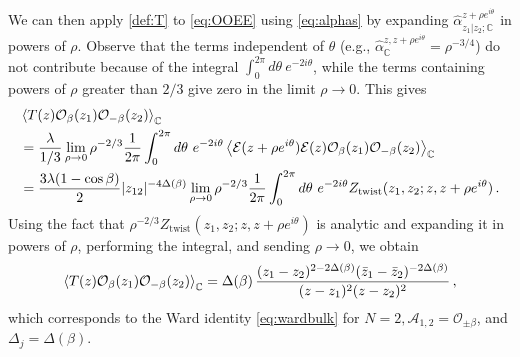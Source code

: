 \documentclass[a4paper,11pt]{article}
\begin{document}
We can then apply \eqref{def:T} to \eqref{eq:OOEE} using \eqref{eq:alphas} by expanding $\hat{\alpha}^{z+\rho e^{i \theta}}_{z_1|z_2;\mathbb{C}}$ in powers of $\rho$. Observe that the terms independent of $\theta$ (e.g., $\hat\alpha_{\mathbb{C}}^{z,z+\rho e^{i \theta}}=\rho^{-3/4}$) do not contribute because of the integral $\int_0^{2\pi} d \theta ~ e^{-2i \theta}$, while the terms containing powers of $\rho$ greater than $2/3$ give zero in the limit $\rho \to 0$.
This gives
\begin{align}
\begin{split} \label{eq:TOO-Ztwist}
    & \Braket{T(z) \mathcal{O}_\beta(z_1) \mathcal{O}_{-\beta}(z_2)}_{\mathbb{C}} \\
    &= \frac{\lambda}{1/3}
    \lim_{\rho \to 0} \rho^{-2/3}
    \frac{1}{2\pi} \int_{0}^{2\pi} d \theta ~ e^{-2i \theta}
    \Braket{\mathcal{E}(z+\rho e^{i \theta}) \mathcal{E}(z) \mathcal{O}_\beta(z_1) \mathcal{O}_{-\beta}(z_2)}_{\mathbb{C}} \\
    &= \frac{3\lambda(1-\cos\beta)}{2} |z_{12}|^{-4\Delta(\beta)}
    \lim_{\rho \to 0} \rho^{-2/3}
    \frac{1}{2\pi} \int_{0}^{2\pi} d \theta ~ e^{-2i \theta}
    Z_{\text{twist}}(z_1,z_2;z,z+\rho e^{i \theta}) \, .
\end{split}
\end{align}
Using the fact that $\rho^{-2/3} Z_{\text{twist}}(z_1,z_2;z,z+\rho e^{i \theta})$ is analytic and expanding it in powers of $\rho$, performing the integral, and sending $\rho \to 0$, we obtain
\begin{align}
\begin{split} \label{eq:TOO}
    \Braket{T(z) \mathcal{O}_\beta(z_1) \mathcal{O}_{-\beta}(z_2)}_{\mathbb{C}} = \Delta(\beta) \, \frac{ (z_1-z_2)^{2-2\Delta(\beta)} (\bar{z}_1-\bar{z}_2)^{-2\Delta(\beta)} }
    { (z-z_1)^2 (z-z_2)^2 } \, ,
\end{split}
\end{align}
which corresponds to the Ward identity \eqref{eq:wardbulk} for $N=2, \mathcal{A}_{1,2} = \mathcal{O}_{\pm \beta}$, and $\Delta_j = \Delta(\beta)$.
\end{document}
